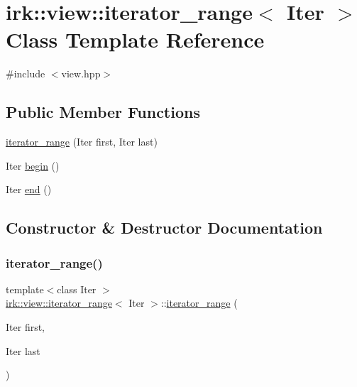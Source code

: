 \hypertarget{classirk_1_1view_1_1iterator__range}{}\section{irk\+:\+:view\+:\+:iterator\+\_\+range$<$ Iter $>$ Class Template Reference}
\label{classirk_1_1view_1_1iterator__range}


{\ttfamily \#include $<$view.\+hpp$>$}

\subsection*{Public Member Functions}
\begin{DoxyCompactItemize}
\item 
\mbox{\hyperlink{classirk_1_1view_1_1iterator__range_a3bf87ecd4d056473286b26b1c8555d4e}{iterator\+\_\+range}} (Iter first, Iter last)
\item 
Iter \mbox{\hyperlink{classirk_1_1view_1_1iterator__range_acdb98ba5c79f29b08971e5ebae0b55b9}{begin}} ()
\item 
Iter \mbox{\hyperlink{classirk_1_1view_1_1iterator__range_ae16f30d12bddb0347e27e746e9c844ca}{end}} ()
\end{DoxyCompactItemize}


\subsection{Constructor \& Destructor Documentation}
\mbox{\label{classirk_1_1view_1_1iterator__range_a3bf87ecd4d056473286b26b1c8555d4e}} 
\subsubsection{\texorpdfstring{iterator\+\_\+range()}{iterator\_range()}}
{\footnotesize\ttfamily template$<$class Iter $>$ \\
\mbox{\hyperlink{classirk_1_1view_1_1iterator__range}{irk\+::view\+::iterator\+\_\+range}}$<$ Iter $>$\+::\mbox{\hyperlink{classirk_1_1view_1_1iterator__range}{iterator\+\_\+range}} (\begin{DoxyParamCaption}\item[{Iter}]{first,  }\item[{Iter}]{last }\end{DoxyParamCaption})\hspace{0.3cm}{\ttfamily [inline]}}




